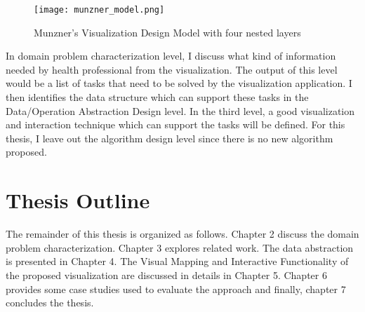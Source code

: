 \begin{figure}
\centering
\texttt{[image: munzner\_model.png]}
\caption{Munzner's Visualization Design Model with four nested layers \label{overflow}}
\end{figure}

In domain problem characterization level, I discuss what kind of information needed by health professional from the visualization. The output of this level would be a list of tasks that need to be solved by the visualization application. I then identifies the data structure which can support these tasks in the Data/Operation Abstraction Design level. In the third level, a good visualization and interaction technique which can support the tasks will be defined. For this thesis, I leave out the algorithm design level since there is no new algorithm proposed.

\section{Thesis Outline}

The remainder of this thesis is organized as follows. Chapter 2 discuss the domain problem characterization. Chapter 3 explores related work. The data abstraction is presented in Chapter 4. The Visual Mapping and Interactive Functionality of the proposed visualization are discussed in details in Chapter 5. Chapter 6 provides some case studies used to evaluate the approach and finally, chapter 7 concludes the thesis.
